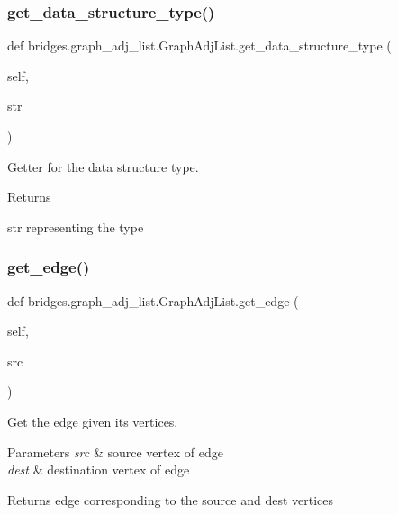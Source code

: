 \subsubsection{\texorpdfstring{get\+\_\+data\+\_\+structure\+\_\+type()}{get\_data\_structure\_type()}}
{\footnotesize\ttfamily def bridges.\+graph\+\_\+adj\+\_\+list.\+Graph\+Adj\+List.\+get\+\_\+data\+\_\+structure\+\_\+type (\begin{DoxyParamCaption}\item[{}]{self,  }\item[{}]{str }\end{DoxyParamCaption})}



Getter for the data structure type. 

\begin{DoxyReturn}{Returns}


str representing the type 
\end{DoxyReturn}
\mbox{\label{classbridges_1_1graph__adj__list_1_1_graph_adj_list_a2f4c60fcaa52adcb509b3bb8138bc3a1}} 
\subsubsection{\texorpdfstring{get\+\_\+edge()}{get\_edge()}}
{\footnotesize\ttfamily def bridges.\+graph\+\_\+adj\+\_\+list.\+Graph\+Adj\+List.\+get\+\_\+edge (\begin{DoxyParamCaption}\item[{}]{self,  }\item[{}]{src }\end{DoxyParamCaption})}



Get the edge given its vertices. 


\begin{DoxyParams}{Parameters}
{\em src} & source vertex of edge \\
\hline
{\em dest} & destination vertex of edge \\
\hline
\end{DoxyParams}
\begin{DoxyReturn}{Returns}
edge corresponding to the source and dest vertices 
\end{DoxyReturn}
\mbox{\label{classbridges_1_1graph__adj__list_1_1_graph_adj_list_abf7a65867ab342ef0eda4a34b3fe011e}} 
